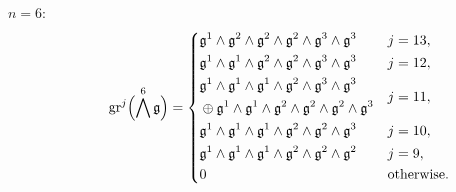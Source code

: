 \begin{description}
  \item[$n=6:$]
        \begin{equation*}
          \operatorname{gr}^{j}\Bigl( \bigwedge^{6}\mathfrak{g} \Bigr) =
          \begin{dcases}
            \mathfrak{g}^{1} \wedge \mathfrak{g}^{2} \wedge \mathfrak{g}^{2} \wedge \mathfrak{g}^{2} \wedge \mathfrak{g}^{3} \wedge \mathfrak{g}^{3} & j=13,                                                                                                                   \\
            \mathfrak{g}^{1} \wedge \mathfrak{g}^{1} \wedge \mathfrak{g}^{2} \wedge \mathfrak{g}^{2} \wedge \mathfrak{g}^{3} \wedge \mathfrak{g}^{3}                                                                                                                   & j=12, \\
            \!\begin{aligned} & \mathfrak{g}^{1} \wedge \mathfrak{g}^{1} \wedge \mathfrak{g}^{1} \wedge \mathfrak{g}^{2} \wedge \mathfrak{g}^{3} \wedge \mathfrak{g}^{3} \\ & \oplus \mathfrak{g}^{1} \wedge \mathfrak{g}^{1} \wedge \mathfrak{g}^{2} \wedge \mathfrak{g}^{2} \wedge \mathfrak{g}^{2} \wedge \mathfrak{g}^{3} \end{aligned} & j=11, \\
            \mathfrak{g}^{1} \wedge \mathfrak{g}^{1} \wedge \mathfrak{g}^{1} \wedge \mathfrak{g}^{2} \wedge \mathfrak{g}^{2} \wedge \mathfrak{g}^{3}                                                                                                                   & j=10, \\
            \mathfrak{g}^{1} \wedge \mathfrak{g}^{1} \wedge \mathfrak{g}^{1} \wedge \mathfrak{g}^{2} \wedge \mathfrak{g}^{2} \wedge \mathfrak{g}^{2}                                                                                                                   & j=9,  \\
            0                                                                                                                                                                                                & \text{otherwise.}
          \end{dcases}
        \end{equation*}


\end{description}
